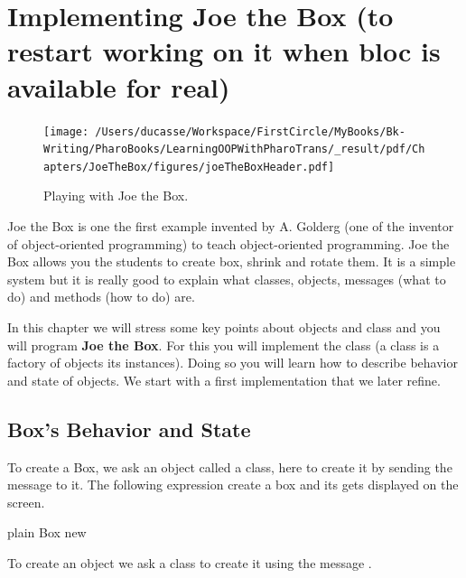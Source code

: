 \documentclass[10pt,twoside,english]{_support/latex/sbabook/sbabook}
\begin{document}
\frontmatter
\pagestyle{plain}

\tableofcontents*
\clearpage\listoffigures

\mainmatter

\chapter{Implementing Joe the Box (to restart working on it when bloc is available for real)}\label{ch:joe}

\begin{figure}

\begin{center}
\texttt{[image: /Users/ducasse/Workspace/FirstCircle/MyBooks/Bk-Writing/PharoBooks/LearningOOPWithPharoTrans/\_result/pdf/Chapters/JoeTheBox/figures/joeTheBoxHeader.pdf]}\caption{Playing with Joe the Box.\label{joeTheBox}}\end{center}
\end{figure}
 

Joe the Box is one the first example invented by A. Golderg (one of the inventor of object-oriented programming) to teach object-oriented programming. Joe the Box allows you the students to create box, shrink and rotate them. It is a simple system but it is really good to explain what classes, objects, messages (what to do) and methods (how to do) are.

In this chapter we will stress some key points about objects and class and you will program \textbf{Joe the Box}. For this you will implement the class  (a class is a factory of objects its instances). Doing so you will learn how to describe behavior and state of
objects.  We start with a first implementation that we later refine. 
\section{Box's Behavior and State}
To create a Box, we ask an object called a class, here  to create it by sending the message  to it.
The following expression create a box and its gets displayed on the screen. 

\begin{displaycode}{plain}
Box new 
\end{displaycode}

\begin{note}
To create an object we ask a class to create it using the message .
\end{note}
\end{document}
